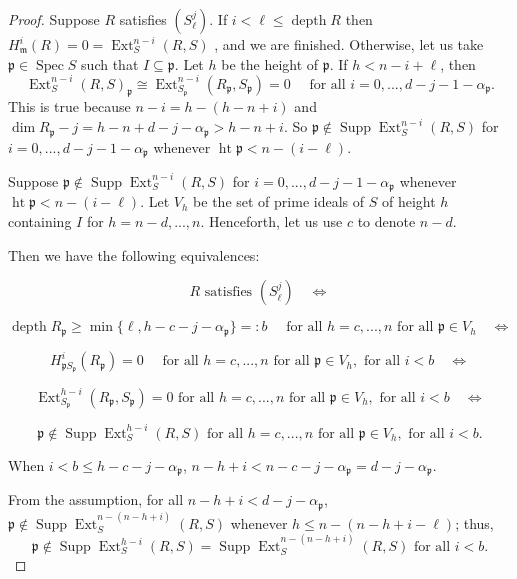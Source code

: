 \documentclass[11pt]{amsart}
\numberwithin{equation}{section}
\theoremstyle{definition}
\theoremstyle{remark}
\newcommand{\Spec}{\operatorname{Spec}}
\newcommand{\height}{\operatorname{ht}}
\newcommand{\Ext}{\operatorname{Ext}}
\newcommand{\Supp}{\operatorname{Supp}}
\newcommand{\depth}{\operatorname{depth}}
\begin{document}
\begin{proof}
Suppose $R$ satisfies $(S_{\ell}^j)$. If $i < \ell \leq \depth R$ then $H_{\mathfrak{m}}^i(R) = 0 = \Ext_S^{n-i}(R,S)$
, and we are finished.
Otherwise, let us take $\mathfrak{p} \in \Spec S$ such that $I \subseteq \mathfrak{p}$. Let $h$ be the height of $\mathfrak{p}$. If $h < n-i+\ell$, then
\[ \Ext _S^{n-i}(R,S)_\mathfrak{p} \cong \Ext _{S_\mathfrak{p}}^{n-i}(R_\mathfrak{p},S_\mathfrak{p}) = 0 \quad \textrm{ for all } i = 0,...,d-j-1-\alpha_\mathfrak{p}. \]
 This is true because $n-i = h-(h-n+i)$ and $\dim R_\mathfrak{p} - j = h-n+d-j-\alpha_\mathfrak{p} > h-n+i$.
So $\mathfrak{p} \notin \Supp \Ext _S ^{n-i} (R,S)$ for $i = 0,...,d-j-1-\alpha_\mathfrak{p}$ whenever $\height \mathfrak{p} < n-(i-\ell)$.

Suppose $\mathfrak{p} \notin \Supp \Ext _S ^{n-i} (R,S)$ for $i = 0,...,d-j-1-\alpha_\mathfrak{p}$ whenever $\height \mathfrak{p} < n-(i-\ell)$. Let $V_h$ be the set of prime ideals of $S$ of height $h$ containing $I$ for $h=n-d,...,n$.  Henceforth, let us use $c$ to denote $n-d$.
 
Then we have the following equivalences:

\[ R \textrm{ satisfies } (S_{\ell}^j) \quad \Leftrightarrow \]

\[ \depth R_\mathfrak{p} \geq \min \{ \ell, h-c-j-\alpha_\mathfrak{p} \} =: b \quad \textrm{ for all } h=c,...,n  \textrm{ for all } \mathfrak{p} \in V_h \quad \Leftrightarrow \]

\[ H_{\mathfrak{p}S_\mathfrak{p}}^i(R_\mathfrak{p})=0 \quad \textrm{ for all } h=c,...,n \textrm{ for all } \mathfrak{p} \in V_h, \textrm{ for all } i < b \quad \Leftrightarrow \]

\[ \Ext _{S_\mathfrak{p}}^{h-i}(R_\mathfrak{p},S_\mathfrak{p})=0 \textrm{ for all } h=c,...,n \textrm{ for all } \mathfrak{p} \in V_h, \textrm{ for all } i < b  \quad \Leftrightarrow \]

\[\mathfrak{p} \notin \Supp \Ext_S^{h-i}(R,S)  \textrm{ for all } h=c,...,n \textrm{ for all } \mathfrak{p} \in V_h, \textrm{ for all } i < b.\]

When $i < b \leq h-c-j-\alpha_\mathfrak{p}$, $n-h+i < n-c-j-\alpha_\mathfrak{p} = d-j-\alpha_\mathfrak{p}$.

From the assumption, for all $ n-h+i < d-j-\alpha_\mathfrak{p}$, $\mathfrak{p} \notin \Supp \Ext _S^{n-(n-h+i)}(R,S)$ whenever $h \leq n-(n-h+i-\ell)$; thus,
\[\mathfrak{p} \notin \Supp \Ext _S ^{h-i} (R,S) = \Supp \Ext _S ^{n-(n-h+i)}(R,S) \textrm{ for all } i < b. \]

\end{proof}
\end{document}
